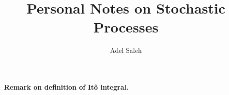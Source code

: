 \documentclass[12pt]{report}
\author{Adel Saleh}
\title{\Huge Personal Notes on Stochastic Processes}
\begin{document}
\renewcommand{\labelitemi}{$ $}
\maketitle



\tableofcontents




\paragraph{Remark on definition of It\^o integral.} 


\end{document}
